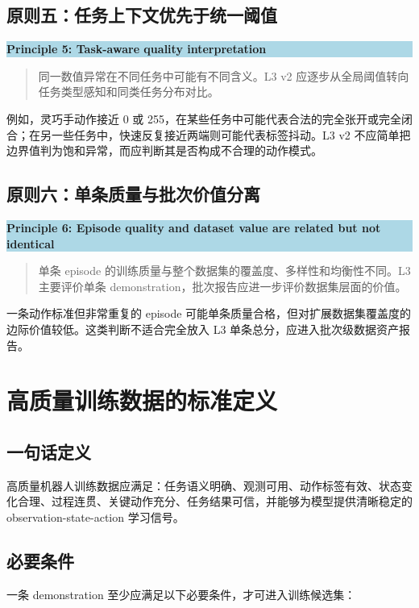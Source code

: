 \documentclass[UTF8,zihao=-4]{ctexart}
\newenvironment{principlebox}[1]{%
  \vspace{0.5em}\noindent\colorbox{LightBlue}{\parbox{0.97\linewidth}{\textbf{#1}\par\vspace{0.25em}}
  }\par\vspace{-0.8em}\noindent\begin{quote}\small
}{\end{quote}\vspace{0.4em}}
\begin{document}
\subsection{原则五：任务上下文优先于统一阈值}

\begin{principlebox}{Principle 5: Task-aware quality interpretation}
同一数值异常在不同任务中可能有不同含义。L3 v2 应逐步从全局阈值转向任务类型感知和同类任务分布对比。
\end{principlebox}

例如，灵巧手动作接近 0 或 255，在某些任务中可能代表合法的完全张开或完全闭合；在另一些任务中，快速反复接近两端则可能代表标签抖动。L3 v2 不应简单把边界值判为饱和异常，而应判断其是否构成不合理的动作模式。

\subsection{原则六：单条质量与批次价值分离}

\begin{principlebox}{Principle 6: Episode quality and dataset value are related but not identical}
单条 episode 的训练质量与整个数据集的覆盖度、多样性和均衡性不同。L3 主要评价单条 demonstration，批次报告应进一步评价数据集层面的价值。
\end{principlebox}

一条动作标准但非常重复的 episode 可能单条质量合格，但对扩展数据集覆盖度的边际价值较低。这类判断不适合完全放入 L3 单条总分，应进入批次级数据资产报告。

\section{高质量训练数据的标准定义}

\subsection{一句话定义}

高质量机器人训练数据应满足：任务语义明确、观测可用、动作标签有效、状态变化合理、过程连贯、关键动作充分、任务结果可信，并能够为模型提供清晰稳定的 observation-state-action 学习信号。

\subsection{必要条件}

一条 demonstration 至少应满足以下必要条件，才可进入训练候选集：
\end{document}
